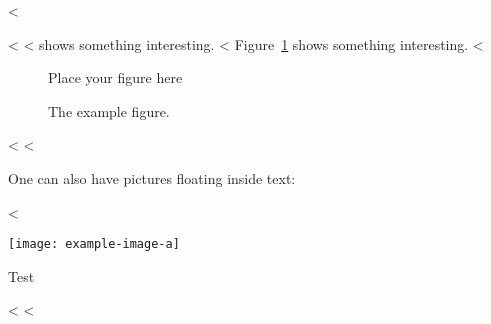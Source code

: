 <%

<%
<%
 shows something interesting.
<%
Figure~\ref{fig:label} shows something interesting.
<%

\begin{figure}
  \centering
  Place your figure here
  \caption{The example figure.}
  \label{fig:label}
\end{figure}
<%
<%

One can also have pictures floating inside text:
\clearpage

<%
\begin{floatingfigure}{.33\linewidth}
\texttt{[image: example-image-a]}
\caption{Test}
\end{floatingfigure}
\blindtext[2]
<%
<%
